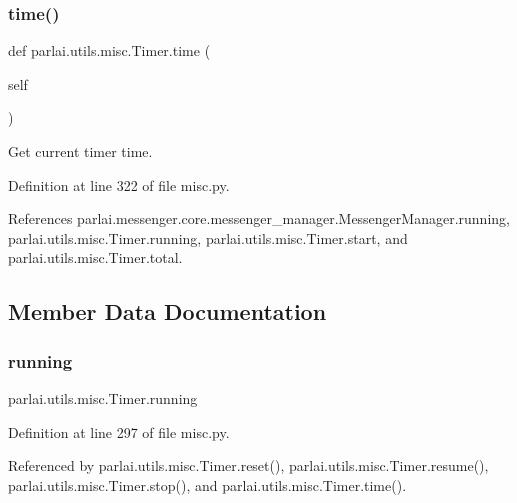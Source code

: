 \subsubsection{\texorpdfstring{time()}{time()}}
{\footnotesize\ttfamily def parlai.\+utils.\+misc.\+Timer.\+time (\begin{DoxyParamCaption}\item[{}]{self }\end{DoxyParamCaption})}

\begin{DoxyVerb}Get current timer time.\end{DoxyVerb}
 

Definition at line 322 of file misc.\+py.



References parlai.\+messenger.\+core.\+messenger\+\_\+manager.\+Messenger\+Manager.\+running, parlai.\+utils.\+misc.\+Timer.\+running, parlai.\+utils.\+misc.\+Timer.\+start, and parlai.\+utils.\+misc.\+Timer.\+total.



\subsection{Member Data Documentation}
\mbox{\label{classparlai_1_1utils_1_1misc_1_1Timer_a05abf50b49c1e26baabe03a9daafa870}} 
\subsubsection{\texorpdfstring{running}{running}}
{\footnotesize\ttfamily parlai.\+utils.\+misc.\+Timer.\+running}



Definition at line 297 of file misc.\+py.



Referenced by parlai.\+utils.\+misc.\+Timer.\+reset(), parlai.\+utils.\+misc.\+Timer.\+resume(), parlai.\+utils.\+misc.\+Timer.\+stop(), and parlai.\+utils.\+misc.\+Timer.\+time().

\mbox{\label{classparlai_1_1utils_1_1misc_1_1Timer_a1c32e2a8785377c980bc4b125fe6db0d}} 
